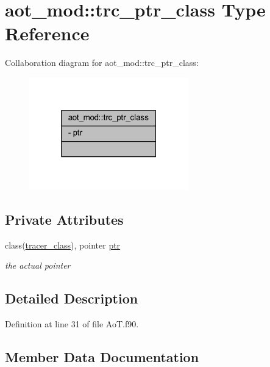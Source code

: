 \hypertarget{structaot__mod_1_1trc__ptr__class}{}\section{aot\+\_\+mod\+:\+:trc\+\_\+ptr\+\_\+class Type Reference}
\label{structaot__mod_1_1trc__ptr__class}


Collaboration diagram for aot\+\_\+mod\+:\+:trc\+\_\+ptr\+\_\+class\+:\nopagebreak
\begin{figure}[H]
\begin{center}
\leavevmode
\includegraphics[width=196pt]{structaot__mod_1_1trc__ptr__class__coll__graph}
\end{center}
\end{figure}
\subsection*{Private Attributes}
\begin{DoxyCompactItemize}
\item 
class(\mbox{\hyperlink{structtracer__base__mod_1_1tracer__class}{tracer\+\_\+class}}), pointer \mbox{\hyperlink{structaot__mod_1_1trc__ptr__class_a4cbb6cce7f206152dddb514337040125}{ptr}}
\begin{DoxyCompactList}\small\item\em the actual pointer \end{DoxyCompactList}\end{DoxyCompactItemize}


\subsection{Detailed Description}


Definition at line 31 of file Ao\+T.\+f90.



\subsection{Member Data Documentation}
\mbox{\label{structaot__mod_1_1trc__ptr__class_a4cbb6cce7f206152dddb514337040125}} 
